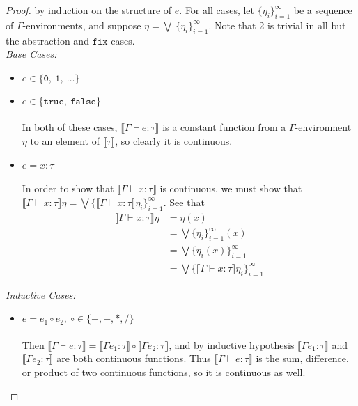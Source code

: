 \documentclass{westhesis}
\theoremstyle{plain}
\theoremstyle{definition}
\begin{document}
\begin{proof}
by induction on the structure of $e$. For all cases, let $\{ \eta_i \}^{\infty}_{i=1}$ be a sequence of $
 \Gamma$-environments, and suppose $ \eta = \bigvee \ \{ \eta_i \}^{\infty}_{i=1}$. Note that 2 is trivial in all but the abstraction
 and $\texttt{fix}$ cases.\\
 \emph{Base Cases: } 
 \begin{itemize}
 \item $e \in \{ \texttt{0}, \ \texttt{1}, \ \ldots \}$
 \item $e \in \{ \texttt{true}, \ \texttt{false} \}$\\ \\
  In both of these cases, $\llbracket \Gamma \vdash e : \tau \rrbracket$ is a constant function from a $\Gamma$-environment
 $\eta$ to an element of $\llbracket \tau \rrbracket$, so clearly it is continuous. 
 \item $e = x : \tau$ \\ \\
 In order to show that $\llbracket \Gamma \vdash x : \tau \rrbracket$ is continuous, we 
 must show that $\llbracket \Gamma \vdash x : \tau \rrbracket\eta = \bigvee \{ \llbracket \Gamma \vdash x : \tau \rrbracket
  \eta_i \}^{\infty}_{i=1}$. See that
  \begin{align*}
  \llbracket \Gamma \vdash x : \tau \rrbracket\eta &= \eta(x) \\
  &= \bigvee\{\eta_i\}^{\infty}_{i=1}(x) \\
  &= \bigvee\{\eta_i(x)\}^{\infty}_{i=1} \\
  &= \bigvee\{\llbracket \Gamma \vdash x : \tau \rrbracket\eta_i \}^{\infty}_{i=1}
  \end{align*}
 \end{itemize}
 \emph{Inductive Cases: }
 \begin{itemize}
 \item $e = e_1 \circ e_2, \ \circ \in \{+, -, *, / \}$ \\ \\
 Then $\llbracket \Gamma \vdash e : \tau \rrbracket = \llbracket \Gamma e_1 : \tau \rrbracket \circ \llbracket \Gamma e_2 : \tau 
 \rrbracket$, and by inductive hypothesis $\llbracket \Gamma e_1 : \tau \rrbracket$ and $\llbracket \Gamma e_2 : \tau 
 \rrbracket$ are both continuous functions. Thus $\llbracket \Gamma \vdash e : \tau \rrbracket$ is the sum, difference, or 
 product of two continuous functions, so it is continuous as well. 

\end{itemize}
\end{proof}
\end{document}
